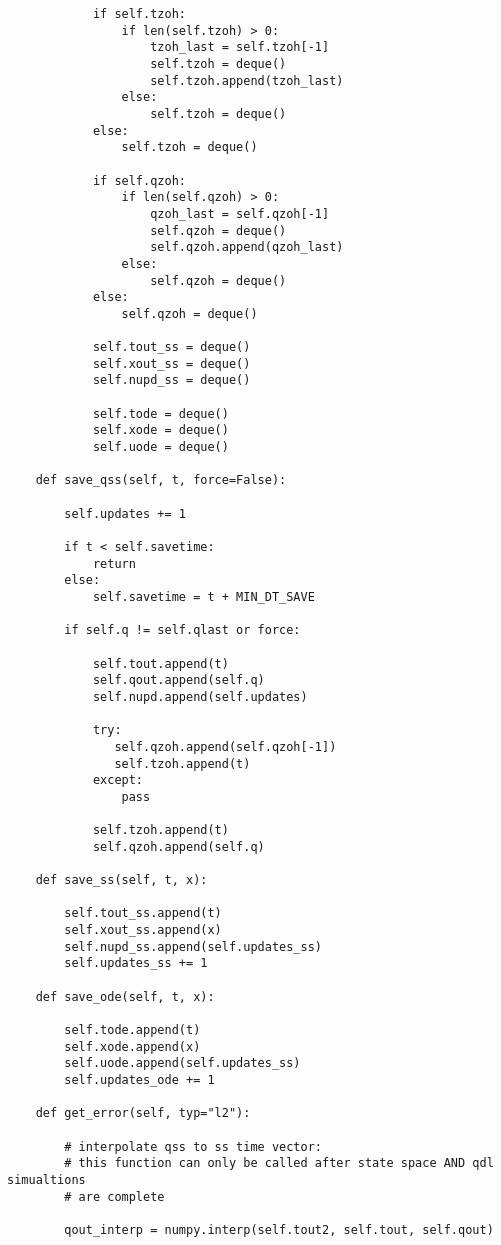 \begin{lstlisting}
            if self.tzoh:
                if len(self.tzoh) > 0:
                    tzoh_last = self.tzoh[-1]
                    self.tzoh = deque()
                    self.tzoh.append(tzoh_last)
                else:
                    self.tzoh = deque()
            else:
                self.tzoh = deque()

            if self.qzoh:
                if len(self.qzoh) > 0:
                    qzoh_last = self.qzoh[-1]
                    self.qzoh = deque()
                    self.qzoh.append(qzoh_last)
                else:
                    self.qzoh = deque()
            else:
                self.qzoh = deque()

            self.tout_ss = deque()
            self.xout_ss = deque()
            self.nupd_ss = deque()

            self.tode = deque()
            self.xode = deque()
            self.uode = deque()

    def save_qss(self, t, force=False):

        self.updates += 1

        if t < self.savetime:
            return
        else:
            self.savetime = t + MIN_DT_SAVE

        if self.q != self.qlast or force:

            self.tout.append(t)
            self.qout.append(self.q)
            self.nupd.append(self.updates)

            try:
               self.qzoh.append(self.qzoh[-1])
               self.tzoh.append(t)
            except:
                pass

            self.tzoh.append(t)
            self.qzoh.append(self.q)

    def save_ss(self, t, x):

        self.tout_ss.append(t)
        self.xout_ss.append(x)
        self.nupd_ss.append(self.updates_ss)
        self.updates_ss += 1

    def save_ode(self, t, x):

        self.tode.append(t)
        self.xode.append(x)
        self.uode.append(self.updates_ss)
        self.updates_ode += 1

    def get_error(self, typ="l2"):

        # interpolate qss to ss time vector:
        # this function can only be called after state space AND qdl simualtions
        # are complete

        qout_interp = numpy.interp(self.tout2, self.tout, self.qout)


\end{lstlisting}
